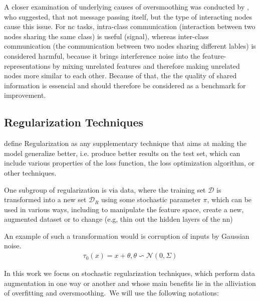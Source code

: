 A closer examination of underlying causes of oversmoothing was conducted by \citet{Chen2020}, who suggested, that not message passing itself, but the type of interacting nodes cause this issue.
For \acf{nc} tasks, intra-class communication (interaction between two nodes sharing the same class) is useful (signal), whereas inter-class communication (the communication between two nodes sharing different lables) is considered harmful, because it brings interference noise into the feature-representations by mixing unrelated features and therefore making unrelated nodes more similar to each other. Because of that, the the quality of shared information is essencial and should therefore be considered as a benchmark for improvement.



\subsection{Regularization Techniques}
\label{sec:related:pred:regularization}

\citet{Kukacka2017} define Regularization as any supplementary technique that aims at making the
model generalize better, i.e. produce better results on the test set, which can include various
properties of the loss function, the loss optimization algorithm, or other techniques.

One subgroup of regularization is via data, where the training set $\mathcal{D}$ is
transformed into a new set $\mathcal{D}_{R}$ using some stochastic parameter
$\pi$, which can be used in various ways, including to manipulate the feature space,
create a new, augmented dataset or to change (e.g, thin out the hidden layers of
the \ac{nn})

An example of such a transformation would is corruption of inputs by Gaussian noise.
\begin{align}
    \tau_{0}(x) = x + \theta, \theta \backsim \mathcal{N}(0, \Sigma)
\end{align}

In this work we focus on stochastic regularization techniques, which perform
data augmentation in one way or another and whose main benefits lie in the alliviation
of overfitting and oversmoothing\cite{Hasanzadeh2020}.\
We will use the following notations: \

